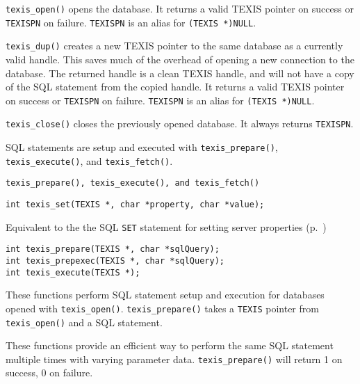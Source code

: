 \DESCRIPTION

\verb`texis_open()` opens the database. It returns a valid TEXIS pointer
on success or \verb`TEXISPN` on failure. \verb`TEXISPN` is an alias for
\verb`(TEXIS *)NULL`.

\verb`texis_dup()` creates a new TEXIS pointer to the same database as a
currently valid handle.  This saves much of the overhead of opening
a new connection to the database.  The returned handle is a clean
TEXIS handle, and will not have a copy of the SQL statement from the
copied handle.
It returns a valid TEXIS pointer on success or
\verb`TEXISPN` on failure. \verb`TEXISPN` is an alias for \verb`(TEXIS *)NULL`.

\verb`texis_close()` closes the previously opened database.  It always
returns \verb`TEXISPN`.

SQL statements are setup and executed with \verb`texis_prepare()`,
\verb`texis_execute()`, and \verb`texis_fetch()`.

\SEE
\begin{verbatim}
texis_prepare(), texis_execute(), and texis_fetch()
\end{verbatim}


\SYNOPSIS
\begin{verbatim}
int texis_set(TEXIS *, char *property, char *value);
\end{verbatim}

\DESCRIPTION

Equivalent to the the SQL {\tt SET} statement for setting server properties
(p.~\pageref{ServerProperties})


\SYNOPSIS
\begin{verbatim}
int texis_prepare(TEXIS *, char *sqlQuery);
int texis_prepexec(TEXIS *, char *sqlQuery);
int texis_execute(TEXIS *);
\end{verbatim}

\DESCRIPTION

These functions perform SQL statement setup and execution for databases
opened with \verb`texis_open()`. \verb`texis_prepare()` takes a \verb`TEXIS`
pointer from \verb`texis_open()` and a SQL statement.

These functions provide an efficient way to perform the same
SQL statement multiple times with varying parameter data.
\verb`texis_prepare()` will return 1 on success, 0 on failure.

